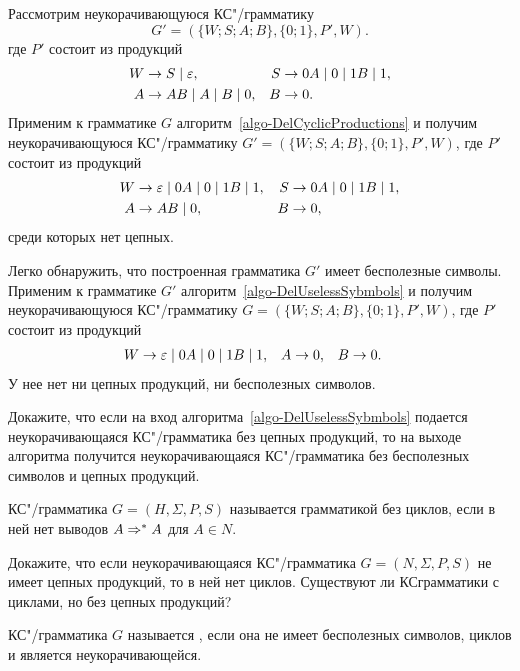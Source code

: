 \begin{myexample}
Рассмотрим неукорачивающуюся КС"/грамматику
\[
    G'=(\{W;S;A;B\},\{0;1\},P',W).
\]
где $P'$ состоит из продукций
\begin{align*}
	W & \to S \mid \varepsilon, &
	S &\to 0A \mid 0 \mid 1B \mid 1, \\
    A &\to AB \mid A \mid B \mid 0, &
	B &\to 0.
\end{align*}
Применим к грамматике $G$ алгоритм~\ref{algo-DelCyclicProductions}  и получим неукорачивающуюся КС"/грамматику $G'=(\{W;S;A;B\},\{0;1\},P',W)$, где $P'$ состоит из продукций
\begin{align*}
	W &\to \varepsilon \mid 0A \mid 0 \mid 1B \mid 1, &
    S &\to 0A \mid 0 \mid 1B \mid 1, \\
    A &\to AB \mid 0, &
    B &\to 0,
\end{align*}
среди которых нет цепных.

Легко обнаружить, что построенная грамматика $G'$ имеет бесполезные символы. Применим к грамматике $G'$ алгоритм~\ref{algo-DelUselessSybmbols} и получим неукорачивающуюся КС"/грамматику $G=(\{W;S;A;B\},\{0;1\},P',W)$, где $P'$ состоит из продукций
\begin{align*}
	W &\to \varepsilon \mid 0A \mid 0 \mid 1B \mid 1, &
    A &\to 0, &
    B &\to 0.
\end{align*}
У нее нет ни цепных продукций, ни бесполезных символов.
\end{myexample}

\begin{myproblem}
\label{problem-GrammarToEpsFreeGrammarWOCyclicSymbols}
Докажите, что если на вход алгоритма~\ref{algo-DelUselessSybmbols} подается неукорачивающаяся КС"/грамматика без цепных продукций, то на выходе алгоритма получится неукорачивающаяся КС"/грамматика без бесполезных символов и цепных продукций.

КС"/грамматика $G=(H,\Sigma,P,S)$ называется грамматикой без циклов, если в ней нет выводов $A\Rightarrow^*A$ для $A\in N$.
\end{myproblem}

\begin{myproblem}
Докажите, что если неукорачивающаяся КС"/грамматика $G=(N,\Sigma,P,S)$ не имеет цепных продукций, то в ней нет циклов. Существуют ли КС\-грамматики с циклами, но без цепных продукций?
\end{myproblem}

КС"/грамматика $G$ называется , если она не имеет бесполезных символов, циклов и является неукорачивающейся.

